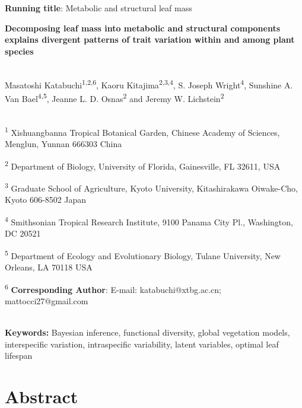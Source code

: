 \documentclass[
  12pt,
  letterpaper,
  DIV=11,
  numbers=noendperiod]{scrartcl}
\author{}
\date{}
\begin{document}
\ifdefined\Shaded\renewenvironment{Shaded}{\begin{tcolorbox}[frame hidden, sharp corners, enhanced, breakable, borderline west={3pt}{0pt}{shadecolor}, interior hidden, boxrule=0pt]}{\end{tcolorbox}}\fi

\textbf{Running title}: Metabolic and structural leaf mass

\textbf{Decomposing leaf mass into metabolic and structural components
explains divergent patterns of trait variation within and among plant
species}\\
\strut \\
Masatoshi Katabuchi\textsuperscript{1,2,6}, Kaoru
Kitajima\textsuperscript{2,3,4}, S. Joseph Wright\textsuperscript{4},
Sunshine A. Van Bael\textsuperscript{4,5}, Jeanne L. D.
Osnas\textsuperscript{2} and Jeremy W. Lichstein\textsuperscript{2}\\
\strut \\
\textsuperscript{1} Xishuangbanna Tropical Botanical Garden, Chinese
Academy of Sciences, Menglun, Yunnan 666303 China

\textsuperscript{2} Department of Biology, University of Florida,
Gainesville, FL 32611, USA

\textsuperscript{3} Graduate School of Agriculture, Kyoto University,
Kitashirakawa Oiwake-Cho, Kyoto 606-8502 Japan

\textsuperscript{4} Smithsonian Tropical Research Institute, 9100 Panama
City Pl., Washington, DC 20521

\textsuperscript{5} Department of Ecology and Evolutionary Biology,
Tulane University, New Orleans, LA 70118 USA

\textsuperscript{6} \textbf{Corresponding Author}: E-mail:
katabuchi@xtbg.ac.cn; mattocci27@gmail.com\\
\strut \\
\textbf{Keywords:} Bayesian inference, functional diversity, global
vegetation models, interspecific variation, intraspecific variability,
latent variables, optimal leaf lifespan

\newpage

\hypertarget{abstract}{%
\section{Abstract}\label{abstract}}
\end{document}
